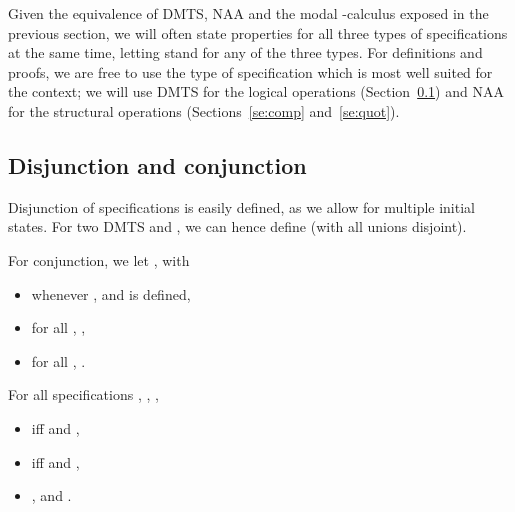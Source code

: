 \documentclass[twocolumn]{svjour3-dummy}
\newcommand*\NAA{NAA\xspace}
\begin{document}
Given the equivalence of DMTS, \NAA and the modal -calculus
exposed in the previous section, we will often state properties for
all three types of specifications at the same time, letting 
stand for any of the three types.  For definitions and proofs, we are
free to use the type of specification which is most well suited for
the context; we will use DMTS for the logical operations
(Section~\ref{se:disjconj}) and \NAA for the structural operations
(Sections~\ref{se:comp} and~\ref{se:quot}).

\subsection{Disjunction and conjunction}
\label{se:disjconj}

Disjunction of specifications is easily defined, as we allow for
multiple initial states.  For two DMTS  and , we can hence
define  (with all unions disjoint).

For conjunction, we let , with
\begin{itemize}
\item  whenever ,  and  is defined,
\item for all , ,
\item for all , .
\end{itemize}

\begin{theorem}
  \label{th:condis}
  For all specifications , , ,
  \begin{itemize}
  \item  iff  and ,
  \item  iff  and ,
  \item , and
    .
  \end{itemize}
\end{theorem}
\end{document}

